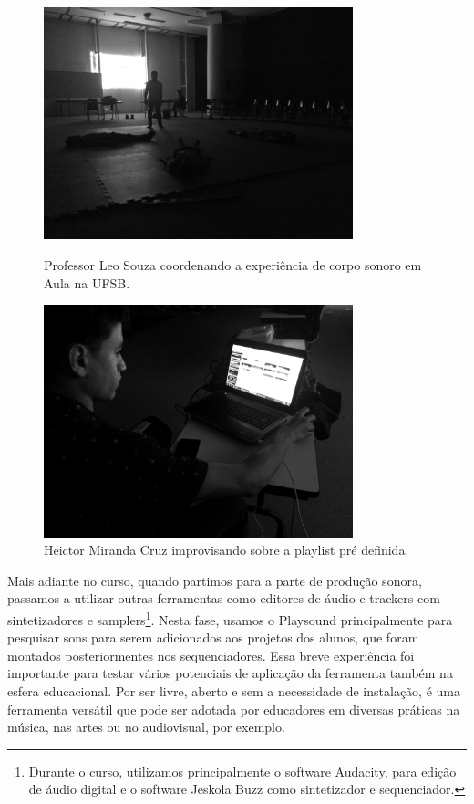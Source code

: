 \begin{figure}[hp]

\includegraphics[width=0.8\textwidth]{pictures/cap4/leo_ufsb}
\caption{\label{psufsb}Professor Leo Souza coordenando a experiência de corpo sonoro em Aula na UFSB.}
\label{fig:psufsb}

\includegraphics[width=0.8\textwidth]{pictures/cap4/heitor_ufsb}
\caption{\label{psufsb2}Heictor Miranda Cruz improvisando sobre a playlist pré definida.}

\label{fig:psufsb2}
\end{figure}

Mais adiante no curso, quando partimos para a parte de produção sonora, passamos a utilizar outras ferramentas como editores de áudio e trackers com sintetizadores e samplers\footnote{Durante o curso, utilizamos principalmente o software Audacity, para edição de áudio digital e o software Jeskola Buzz como sintetizador e sequenciador.}. Nesta fase, usamos o Playsound principalmente para pesquisar sons para serem adicionados aos projetos dos alunos, que foram montados posteriormentes nos sequenciadores. Essa breve experiência foi importante para testar vários potenciais de aplicação da ferramenta também na esfera educacional. Por ser livre, aberto e sem a necessidade de instalação, é uma ferramenta versátil que pode ser adotada por educadores em diversas práticas na música, nas artes ou no audiovisual, por exemplo.

